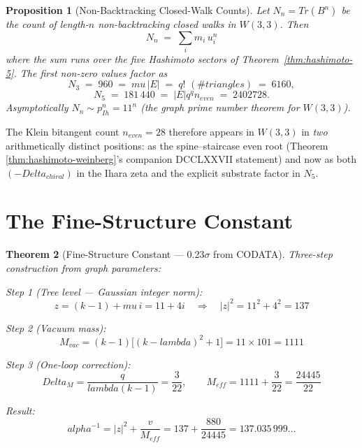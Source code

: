 \documentclass[12pt,a4paper]{article}
\def\mathrm#1{#1}%
\def\textbf#1{#1}%
\def\text#1{#1}%
\def\alpha{alpha}%
\def\Delta{Delta}%
\def\lambda{lambda}%
\def\mu{mu}%
\def\cdot{ }%
\newtheorem{theorem}{Theorem}[section]
\newtheorem{proposition}[theorem]{Proposition}
\theoremstyle{definition}
\renewcommand{\Tr}{\mathrm{Tr}}
\begin{document}
\begin{proposition}[Non-Backtracking Closed-Walk Counts]
\label{prop:N_n}
Let $N_n = \Tr(B^n)$ be the count of length-$n$ non-backtracking
closed walks in $W(3,3)$.  Then
\begin{equation}
N_n \;=\; \sum_i m_i\, u_i^n
\end{equation}
where the sum runs over the five Hashimoto sectors of
Theorem~\ref{thm:hashimoto-5}.  The first non-zero values factor as
\[
N_3 \;=\; 960 \;=\; \mu\,|E| \;=\; q!\,\cdot\,(\text{\#triangles}) \;=\; 6 \cdot 160,
\]
\[
N_5 \;=\; 181\,440 \;=\; |E| \cdot q^q \cdot n_{\mathrm{even}}
       \;=\; 240 \cdot 27 \cdot 28.
\]
Asymptotically $N_n \sim p_{\mathrm{Ih}}^n = 11^n$ (the graph prime
number theorem for $W(3,3)$).
\end{proposition}

The Klein bitangent count $n_{\mathrm{even}} = 28$ therefore appears
in $W(3,3)$ in \emph{two} arithmetically distinct positions: as the
spine--staircase even root (Theorem \ref{thm:hashimoto-weinberg}'s
companion DCCLXXVII statement) and now as both
$(-\Delta_{\mathrm{chiral}})$ in the Ihara zeta and the explicit
substrate factor in $N_5$.


\section{The Fine-Structure Constant}
\label{sec:alpha}

\begin{theorem}[Fine-Structure Constant --- 0.23$\sigma$ from CODATA]
\label{thm:alpha}
Three-step construction from graph parameters:

\textbf{Step 1 (Tree level --- Gaussian integer norm):}
\begin{equation}
z = (k-1)+\mu\,i = 11+4i \quad\Longrightarrow\quad
|z|^2 = 11^2+4^2 = 137
\end{equation}

\textbf{Step 2 (Vacuum mass):}
\begin{equation}
M_{\text{vac}} = (k-1)\bigl[(k-\lambda)^2+1\bigr]
= 11\times 101 = 1111
\end{equation}

\textbf{Step 3 (One-loop correction):}
\begin{equation}
\Delta_M = \frac{q}{\lambda(k-1)} = \frac{3}{22}, \qquad
M_{\text{eff}} = 1111+\frac{3}{22} = \frac{24445}{22}
\end{equation}

\textbf{Result:}
\begin{equation}
\boxed{\alpha^{-1} = |z|^2 + \frac{v}{M_{\text{eff}}}
= 137+\frac{880}{24445} = 137.035\,999\ldots}
\label{eq:alpha}
\end{equation}
\end{theorem}
\end{document}
